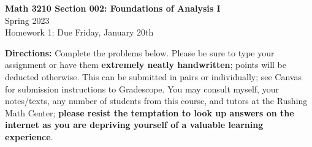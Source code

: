 \documentclass[10pt]{article}
\begin{document}
\begin{center}
\textbf{Math 3210 Section 002: Foundations of Analysis I}\\ 
Spring 2023\\
Homework 1: Due Friday, January 20th 
\end{center}

\noindent\textbf{Directions:} Complete the problems below. Please be sure to type your assignment or have them \textbf{extremely neatly handwritten}; points will be deducted otherwise. This can be submitted in pairs or individually; see Canvas for submission instructions to Gradescope. You may consult myself, your notes/texts, any number of students from this course, and tutors at the Rushing Math Center; \textbf{please resist the temptation to look up answers on the internet as you are depriving yourself of a valuable learning experience}. 
\end{document}
